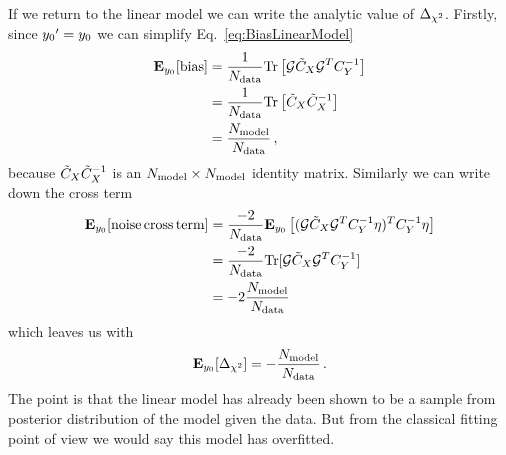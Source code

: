 If we return to the linear model we can write the analytic value of
$\Delta_{\chi^2}$. Firstly, since ${{y_0}^{\prime}}=y_0$ we can
simplify Eq.~\ref{eq:BiasLinearModel}
\begin{equation}\label{eq:BiasLinearModelSimple}
    \begin{split}
        \mathbf{E}_{y_0}[{\rm bias}] &= \frac{1}{N_{\rm data}}
            {\rm Tr} \left[
                \mathcal{G} \tilde{C}_X \mathcal{G}^T C_{Y}^{-1}
            \right] \\
            &= \frac{1}{N_{\rm data}}{\rm Tr} \left[ \tilde{C}_X \tilde{C}_X^{-1}\right] \\
            &= \frac{N_{\rm model}}{N_{\rm data}} \, ,
    \end{split}
\end{equation}
because $\tilde{C}_X \tilde{C}_X^{-1}$ is an $N_{\rm model} \times N_{\rm model}$ identity
matrix. Similarly we can write down the cross term
\begin{equation}
    \begin{split}
        \mathbf{E}_{y_0}[{\rm noise \, cross \, term}] &= \frac{-2}{N_{\rm data}} \mathbf{E}_{y_0} \left[
            (\mathcal{G} \tilde{C}_X \mathcal{G}^T C_{Y}^{-1} \eta)^T C_{Y}^{-1} \eta
        \right] \\
        &= \frac{-2}{N_{\rm data}}{\rm Tr} [\mathcal{G} \tilde{C}_X \mathcal{G}^T C_{Y}^{-1}] \\
        &= -2 \frac{N_{\rm model}}{N_{\rm data}}
    \end{split}
\end{equation}
which leaves us with
\begin{equation}
    \mathbf{E}_{y_0}[\Delta_{\chi^2}] = - \frac{N_{\rm model}}{N_{\rm data}} \, .
\end{equation}
The point is that the linear model has already been shown to be a sample from
posterior distribution of the model given the data. But from the classical
fitting point of view we would say this model has overfitted.

